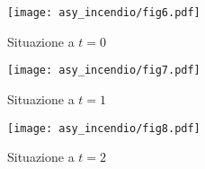 \begin{center}
	\begin{minipage}{0.3\linewidth}
		\texttt{[image: asy\_incendio/fig6.pdf]}
		\caption*{Situazione a $t=0$}
	\end{minipage}
	\hspace{0.03\linewidth}
	\begin{minipage}{0.3\linewidth}
		\texttt{[image: asy\_incendio/fig7.pdf]}
		\caption*{Situazione a $t=1$}
	\end{minipage}
	\hspace{0.03\linewidth}
	\begin{minipage}{0.3\linewidth}
		\texttt{[image: asy\_incendio/fig8.pdf]}
		\caption*{Situazione a $t=2$}
	\end{minipage}
\end{center}
